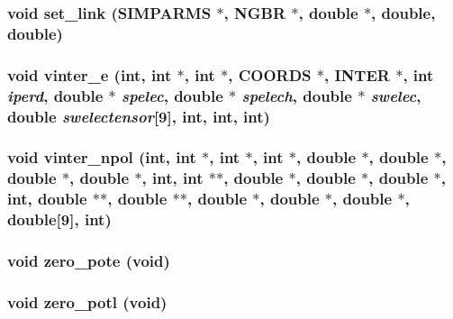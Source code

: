 \subsubsection{\setlength{\rightskip}{0pt plus 5cm}void set\_\-link ({\bf SIMPARMS} $\ast$, {\bf NGBR} $\ast$, double $\ast$, double, double)}\label{energy_2proto__energy_8h_01457d55ac2bed0a0422b0a3de917fe9}


\subsubsection{\setlength{\rightskip}{0pt plus 5cm}void vinter\_\-e (int, int $\ast$, int $\ast$, {\bf COORDS} $\ast$, {\bf INTER} $\ast$, int {\em iperd}, double $\ast$ {\em spelec}, double $\ast$ {\em spelech}, double $\ast$ {\em swelec}, double {\em swelectensor}[9], int, int, int)}\label{energy_2proto__energy_8h_f77c5471556a317879194322b0a63c9a}


\subsubsection{\setlength{\rightskip}{0pt plus 5cm}void vinter\_\-npol (int, int $\ast$, int $\ast$, int $\ast$, double $\ast$, double $\ast$, double $\ast$, double $\ast$, int, int $\ast$$\ast$, double $\ast$, double $\ast$, double $\ast$, int, double $\ast$$\ast$, double $\ast$$\ast$, double $\ast$, double $\ast$, double $\ast$, double[9], int)}\label{energy_2proto__energy_8h_0c074dbaa7da0323d093dd1982758a6d}


\subsubsection{\setlength{\rightskip}{0pt plus 5cm}void zero\_\-pote (void)}\label{energy_2proto__energy_8h_d8204917082dd0a8cf30e570067a6318}


\subsubsection{\setlength{\rightskip}{0pt plus 5cm}void zero\_\-potl (void)}\label{energy_2proto__energy_8h_8933e7a0229d4d9168448420a0e20dfc}


